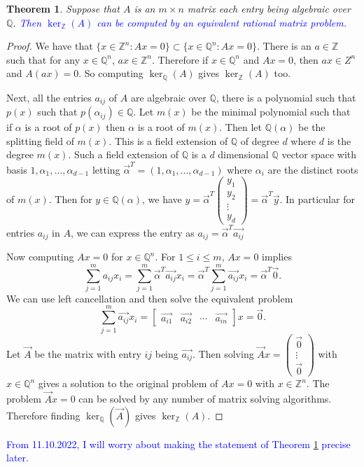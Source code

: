 \documentclass{article}
\renewcommand{\leq}{\leqslant}
\newcommand{\Z}[0]{\mathbb{Z}}		%
\newcommand{\Q}[0]{\mathbb{Q}}		%
\newtheorem{thm}{Theorem}[section]
\theoremstyle{definition}
\theoremstyle{remark}
\begin{document}
\begin{thm}\label{AlgebraicEnteries}
Suppose that $A$ is an $m\times n$ matrix each entry being algebraic over $\Q$. \textcolor{blue}{Then $\ker_\Z(A)$ can be computed by an equivalent rational matrix problem. }
\end{thm}
\begin{proof} 
We have that $\{x\in \Z^n : Ax = 0\} \subset \{x\in \Q^n : Ax =0\}$. There is an $a\in \Z$ such that for any  $x\in \Q^n$, $ax \in \Z^n$. Therefore if $x\in \Q^n$ and $Ax =0$, then $ax\in Z^n$ and $A(ax) = 0$. So computing $\ker_\Q(A)$ gives $\ker_\Z(A)$ too. 

Next, all the entries $a_{ij}$ of $A$ are algebraic over $\Q$, there is a polynomial such that $p(x)$ such that $p(\alpha_{ij}) \in \Q$. Let $m(x)$ be the minimal polynomial such that if $\alpha$ is a root of $p(x)$ then $\alpha$ is a root of $m(x)$. Then let $\Q(\alpha)$ be the splitting field of $m(x)$. This is a field extension of $\Q$ of degree $d$ where $d$ is the degree $m(x)$. Such a field extension of $\Q$ is a $d$ dimensional $\Q$ vector space with basis $1,\alpha_1,\dots,\alpha_{d-1}$ letting $\vec{\alpha}^T = (1,\alpha_1,...,\alpha_{d-1})$ where $\alpha_i$ are the distinct roots of $m(x)$. Then for $y\in \Q(\alpha)$, we have $y =\vec{\alpha}^T \begin{pmatrix}
y_1\\ y_2\\ \vdots \\ y_d 
\end{pmatrix} = \vec{\alpha}^T \vec{y}$. In particular for entries $a_{ij} $ in $A$, we can express the entry as  $a_{ij}=\vec{\alpha}^T \vec{a_{ij}} $

Now computing $Ax =0$ for $x\in \Q^n$. For $1\leq i\leq m$, $Ax=0$ implies \begin{equation}
    \sum_{j=1}^m a_{ij} x_i = \sum_{j=1}^m \vec{\alpha}^T \vec{a_{ij}} x_i  = \vec{\alpha}^T\sum_{j=1}^m  \vec{a_{ij}} x_i  =\vec{\alpha}^T \vec{0}.
\end{equation} We can use left cancellation and then solve the equivalent problem \begin{equation}
     \sum_{j=1}^m \vec{a_{ij}} x_i = \begin{bmatrix} \vec{a_{i1}} & \vec{a_{i2}} & \cdots & \vec{a_{in}} \end{bmatrix} x=  \vec{0}.
\end{equation}  Let $\vec{A}$ be the matrix with entry $ij$ being $\vec{a_{ij}}$. Then solving   $\vec{A} x  =  \begin{pmatrix}\vec{0} \\ \vdots \\ \vec{0}
\end{pmatrix}$ with $x\in \Q^n$ gives a solution to the original problem of $Ax = 0$ with $x\in\Z^n$. The problem  $\vec A x = 0$ can be solved by any number of matrix solving algorithms. Therefore finding $\ker_\Q(\vec{A})$ gives $\ker_\Z(A).$


\end{proof}
\textcolor{blue}{From 11.10.2022, I will worry about making the statement of Theorem \ref{AlgebraicEnteries} precise later.}
\end{document}
